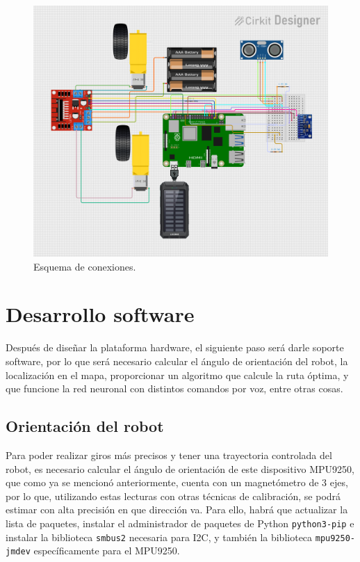 \begin{figure}[H]
  \centering
  \includegraphics[scale=0.5]{figs/final_circuito} %
  \caption{Esquema de conexiones.}
  \label{fig:circuito}
\end{figure}

\section{Desarrollo software}
\label{sec:desarrollo_software}

Después de diseñar la plataforma hardware, el siguiente paso será darle soporte software, por lo que será necesario calcular el ángulo de orientación del robot, la localización en el mapa, proporcionar un algoritmo que calcule la ruta óptima, y que funcione la red neuronal con distintos comandos por voz, entre otras cosas.


\subsection{Orientación del robot}
\label{subsec:orientacion_robot}

Para poder realizar giros más precisos y tener una trayectoria controlada del robot, es necesario calcular el ángulo de orientación de este dispositivo MPU9250, que como ya se mencionó anteriormente, cuenta con un magnetómetro de 3 ejes, por lo que, utilizando estas lecturas con otras técnicas de calibración, se podrá estimar con alta precisión en que dirección va. Para ello, habrá que actualizar la lista de paquetes, instalar el administrador de paquetes de Python \verb|python3-pip|  e instalar la biblioteca \verb|smbus2| necesaria para I2C, y también la biblioteca \verb|mpu9250-jmdev| específicamente para el MPU9250.



